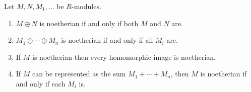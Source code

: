 Let $M, N, M_1, \ldots$ be $R$-modules.
\begin{enumerate}[label=(\roman*)]
	\item $M\oplus N$ is noetherian if and only if both $M$ and $N$ are.
	\item $M_1\oplus\cdots\oplus M_n$ is noetherian if and only if all $M_i$ are.
	\item If $M$ is noetherian then every homomorphic image is noetherian.
	\item If $M$ can be represented as the sum $M_1 + \cdots + M_n$, then $M$ is
		noetherian if and only if each $M_i$ is.
\end{enumerate}

